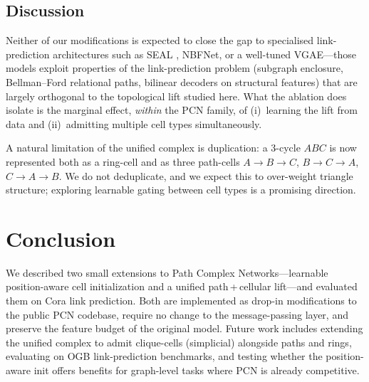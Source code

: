 \documentclass[11pt]{article}
\newcommand{\pcn}{\textsc{PCN}}
\begin{document}
\subsection{Discussion}

Neither of our modifications is expected to close the gap to
specialised link-prediction architectures such as SEAL
\citep{zhang2018seal}, NBFNet, or a well-tuned VGAE---those models
exploit properties of the link-prediction problem (subgraph
  enclosure, Bellman--Ford relational paths, bilinear decoders on
structural features) that are largely orthogonal to the topological
lift studied here. What the ablation does isolate is the marginal
effect, \emph{within} the \pcn{} family, of (i)~learning the lift from
data and (ii)~admitting multiple cell types simultaneously.

A natural limitation of the unified complex is duplication: a
3-cycle $ABC$ is now represented both as a ring-cell and as three
path-cells $A{\to}B{\to}C$, $B{\to}C{\to}A$, $C{\to}A{\to}B$. We do
not deduplicate, and we expect this to over-weight triangle
structure; exploring learnable gating between cell types is a
promising direction.

\section{Conclusion}

We described two small extensions to Path Complex Networks---learnable
position-aware cell initialization and a unified path\,+\,cellular
lift---and evaluated them on Cora link prediction. Both are
implemented as drop-in modifications to the public \pcn{} codebase,
require no change to the message-passing layer, and preserve the
feature budget of the original model. Future work includes extending
the unified complex to admit clique-cells (simplicial) alongside
paths and rings, evaluating on OGB link-prediction benchmarks, and
testing whether the position-aware init offers benefits for
graph-level tasks where \pcn{} is already competitive.
\end{document}
